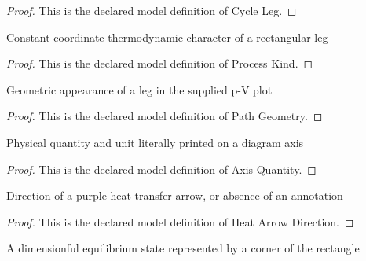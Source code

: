 \begin{proof}
  This is the declared model definition of Cycle Leg.
\end{proof}
\begin{definition}
  \label{def:physics:phyx-mini-0419:phyxminiproblems-problemphyxmini0419-processkind}
  Constant-coordinate thermodynamic character of a rectangular leg
\end{definition}
\begin{proof}
  This is the declared model definition of Process Kind.
\end{proof}
\begin{definition}
  \label{def:physics:phyx-mini-0419:phyxminiproblems-problemphyxmini0419-pathgeometry}
  Geometric appearance of a leg in the supplied p-V plot
\end{definition}
\begin{proof}
  This is the declared model definition of Path Geometry.
\end{proof}
\begin{definition}
  \label{def:physics:phyx-mini-0419:phyxminiproblems-problemphyxmini0419-axisquantity}
  Physical quantity and unit literally printed on a diagram axis
\end{definition}
\begin{proof}
  This is the declared model definition of Axis Quantity.
\end{proof}
\begin{definition}
  \label{def:physics:phyx-mini-0419:phyxminiproblems-problemphyxmini0419-heatarrowdirection}
  Direction of a purple heat-transfer arrow, or absence of an annotation
\end{definition}
\begin{proof}
  This is the declared model definition of Heat Arrow Direction.
\end{proof}
\begin{definition}
  \label{def:physics:phyx-mini-0419:phyxminiproblems-problemphyxmini0419-thermodynamicstate}
  A dimensionful equilibrium state represented by a corner of the rectangle
\end{definition}
